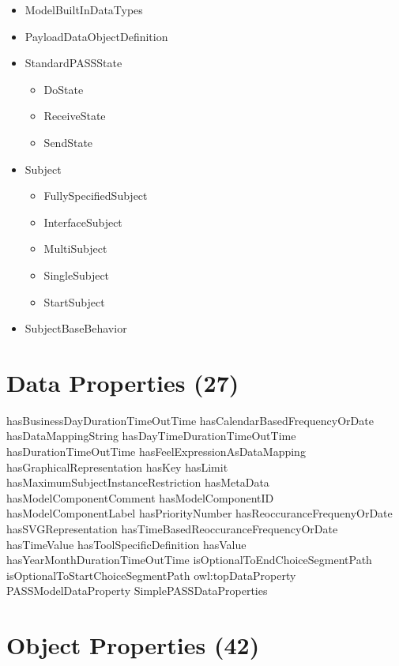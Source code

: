 \begin{itemize}
\begin{itemize}
	\item ModelBuiltInDataTypes
	\item PayloadDataObjectDefinition
	\item StandardPASSState
	\begin{itemize}
		\item DoState
		\item ReceiveState
		\item SendState
	\end{itemize}
	\item Subject
	\begin{itemize}
		\item FullySpecifiedSubject
		\item InterfaceSubject
		\item MultiSubject
		\item SingleSubject
		\item StartSubject
	\end{itemize}
	\item SubjectBaseBehavior
\end{itemize}
\end{itemize}	

			
			
			
			










\section{Data Properties (27)}

hasBusinessDayDurationTimeOutTime
hasCalendarBasedFrequencyOrDate
hasDataMappingString
hasDayTimeDurationTimeOutTime
hasDurationTimeOutTime
hasFeelExpressionAsDataMapping
hasGraphicalRepresentation
hasKey
hasLimit
hasMaximumSubjectInstanceRestriction
hasMetaData
hasModelComponentComment
hasModelComponentID
hasModelComponentLabel
hasPriorityNumber
hasReoccuranceFrequenyOrDate
hasSVGRepresentation
hasTimeBasedReoccuranceFrequencyOrDate
hasTimeValue
hasToolSpecificDefinition
hasValue
hasYearMonthDurationTimeOutTime
isOptionalToEndChoiceSegmentPath
isOptionalToStartChoiceSegmentPath
owl:topDataProperty
PASSModelDataProperty
SimplePASSDataProperties




\section{Object Properties (42)}

